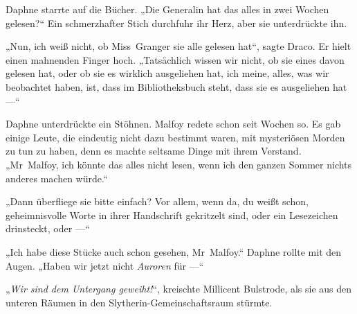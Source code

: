 Daphne starrte auf die Bücher.
„Die Generalin hat das alles in zwei Wochen gelesen?“ Ein schmerzhafter Stich durchfuhr ihr Herz, aber sie unterdrückte ihn.

„Nun, ich weiß nicht, ob Miss~Granger sie alle gelesen hat“, sagte Draco. Er hielt einen mahnenden Finger hoch.
„Tatsächlich wissen wir nicht, ob sie eines davon gelesen hat, oder ob sie es wirklich ausgeliehen hat, ich meine, alles, was wir beobachtet haben, ist, dass im Bibliotheksbuch steht, dass sie es ausgeliehen hat —“

Daphne unterdrückte ein Stöhnen. Malfoy redete schon seit Wochen so. Es gab einige Leute, die eindeutig nicht dazu bestimmt waren, mit mysteriösen Morden zu tun zu haben, denn es machte seltsame Dinge mit ihrem Verstand.
„Mr~Malfoy, ich könnte das alles nicht lesen, wenn ich den ganzen Sommer nichts anderes machen würde.“

„Dann überfliege sie bitte einfach? Vor allem, wenn da, du weißt schon, geheimnisvolle Worte in ihrer Handschrift gekritzelt sind, oder ein Lesezeichen drinsteckt, oder —“

„Ich habe diese Stücke auch schon gesehen, Mr~Malfoy.“ Daphne rollte mit den Augen.
„Haben wir jetzt nicht \emph{Auroren} für —“

„\emph{Wir sind dem Untergang geweiht!}“, kreischte Millicent Bulstrode, als sie aus den unteren Räumen in den Slytherin-Gemeinschaftsraum stürmte.

